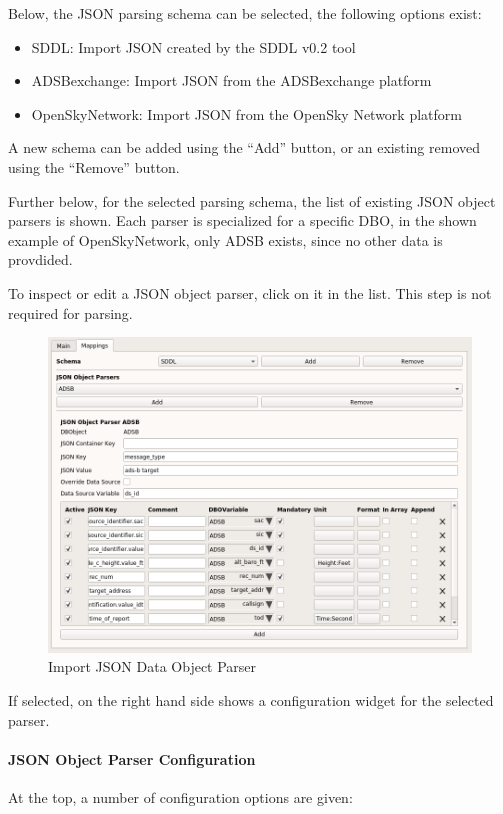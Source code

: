 {Below, the JSON parsing schema can be selected, the following options exist:
\begin{itemize}  
\item SDDL: Import JSON created by the SDDL v0.2 tool
\item ADSBexchange: Import JSON from the ADSBexchange platform
\item OpenSkyNetwork: Import JSON from the OpenSky Network platform
\end{itemize}

A new schema can be added using the ``Add'' button, or an existing removed using the ``Remove'' button.

Further below, for the selected parsing schema, the list of existing JSON object parsers is shown. Each parser is specialized for a specific DBO, in the shown example of OpenSkyNetwork, only ADSB exists, since no other data is provdided.

To inspect or edit a JSON object parser, click on it in the list. This step is not required for parsing.

\begin{figure}[H]
  \hspace*{-1cm}
    \includegraphics[width=16cm,frame]{../screenshots/import_json_data_object_parser.png}
  \caption{Import JSON Data Object Parser}
\end{figure}

If selected, on the right hand side shows a configuration widget for the selected parser.

\paragraph{JSON Object Parser Configuration}
At the top, a number of configuration options are given:

}
